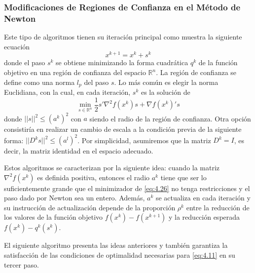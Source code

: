 \subsubsection{Modificaciones de Regiones de Confianza en el Método de Newton}

Este tipo de algoritmos tienen su iteración principal como muestra la siguiente ecuación
\begin{equation*}
x^{k+1} = x^k + s^k
\end{equation*}
donde el paso $s^k$ se obtiene minimizando la forma cuadrática $q^k$ de la función objetivo en una región de confianza del espacio $\mathbb{R}^n$. 
La región de confianza se define como una norma $l_p$ del paso $s$. 
Lo más común es elegir la norma Euclidiana, con la cual, en cada iteración, $s^k$ es la solución de 
\begin{equation*}
\min_{s\in\mathbb{R}^n}\dfrac{1}{2}s'\nabla^2 f(x^k)s + \nabla f(x^k)'s
\label{eq:4.26}
\end{equation*}
donde $||s||^2 \leq (a^k)^2$ con $a$ siendo el radio de la región de confianza. 
Otra opción consistiría en realizar un cambio de escala a la condición previa de la siguiente forma: $||D^ks||^2\leq (a^l)^2$. 
Por simplicidad, asumiremos que la matriz $D^k=I$, es decir, la matriz identidad en el espacio adecuado.

Estos algoritmos se caracterizan por la siguiente idea: cuando la matriz $\nabla^2 f(x^k)$ es definida positiva, entonces el radio $a^k$ tiene que ser lo suficientemente grande que el minimizador de \ref{eq:4.26} no tenga restricciones y el paso dado por Newton sea un entero. 
Además, $a^k$ se actualiza en cada iteración y su instrucción de actualización depende de la proporción $\rho^k$ entre la reducción de los valores de la función objetivo $f(x^k)-f(x^{k+1})$ y la reducción esperada $f(x^k)-q^k(s^k).$

El siguiente algoritmo presenta las ideas anteriores y también garantiza la satisfacción de las condiciones de optimalidad necesarias para \ref{eq:4.11} en su tercer paso. 

